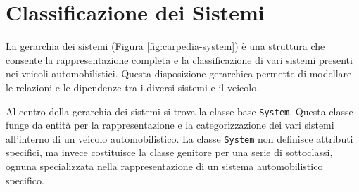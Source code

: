 \begin{figure}
    \label{fig:carpedia-component}
\end{figure}

\section{Classificazione dei Sistemi}

La gerarchia dei sistemi (Figura \ref{fig:carpedia-system}) è una struttura che consente la rappresentazione completa e la classificazione di vari sistemi presenti nei veicoli automobilistici. Questa disposizione gerarchica permette di modellare le relazioni e le dipendenze tra i diversi sistemi e il veicolo.

Al centro della gerarchia dei sistemi si trova la classe base \texttt{System}. Questa classe funge da entità per la rappresentazione e la categorizzazione dei vari sistemi all'interno di un veicolo automobilistico. La classe \texttt{System} non definisce attributi specifici, ma invece costituisce la classe genitore per una serie di sottoclassi, ognuna specializzata nella rappresentazione di un sistema automobilistico specifico.

